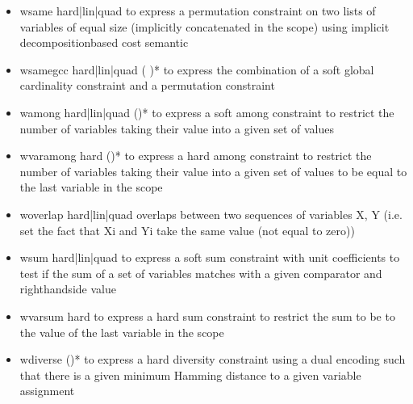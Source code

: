 \documentclass[letterpaper,10pt,openany,oneside,english]{sphinxmanual}
\begin{document}
\begin{fulllineitems}
\begin{itemize}
\begin{itemize}
\item {} 
\sphinxAtStartPar
wsame hard|lin|quad  to express a permutation constraint on two lists of variables of equal size (implicitly concatenated in the scope) using implicit decomposition\sphinxhyphen{}based cost semantic

\item {} 
\sphinxAtStartPar
wsamegcc hard|lin|quad   (  )* to express the combination of a soft global cardinality constraint and a permutation constraint

\item {} 
\sphinxAtStartPar
wamong hard|lin|quad   ()*   to express a soft among constraint to restrict the number of variables taking their value into a given set of values

\item {} 
\sphinxAtStartPar
wvaramong hard   ()* to express a hard among constraint to restrict the number of variables taking their value into a given set of values to be equal to the last variable in the scope

\item {} 
\sphinxAtStartPar
woverlap hard|lin|quad    overlaps between two sequences of variables X, Y (i.e. set the fact that Xi and Yi take the same value (not equal to zero))

\item {} 
\sphinxAtStartPar
wsum hard|lin|quad    to express a soft sum constraint with unit coefficients to test if the sum of a set of variables matches with a given comparator and right\sphinxhyphen{}hand\sphinxhyphen{}side value

\item {} 
\sphinxAtStartPar
wvarsum hard   to express a hard sum constraint to restrict the sum to be  to the value of the last variable in the scope

\item {} 
\sphinxAtStartPar
wdiverse  ()* to express a hard diversity constraint using a dual encoding such that there is a given minimum Hamming distance to a given variable assignment


\end{itemize}
\end{itemize}
\end{fulllineitems}
\end{document}

